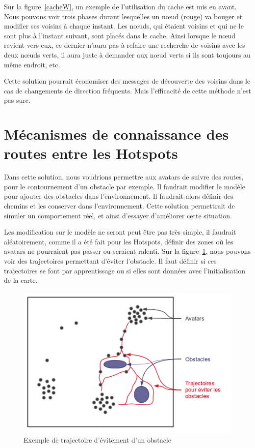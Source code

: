 \documentclass[11pt,a4paper]{article}
\begin{document}
\par Sur la figure~\ref{cacheW}, un exemple de l'utilisation du cache est mis en avant. Nous pouvons voir trois phases durant lesquelles un nœud (rouge) va bouger et modifier ses voisins à chaque instant. Les nœuds, qui étaient voisins et qui ne le sont plus à l'instant suivant, sont placés dans le cache. Ainsi lorsque le nœud revient vers eux, ce dernier n'aura pas à refaire une recherche de voisins avec les deux nœuds verts, il aura juste à demander aux nœud verts si ils sont toujours au même endroit, etc.
\par Cette solution pourrait économiser des messages de découverte des voisins dans le cas de changements de direction fréquents. Mais l'efficacité de cette méthode n'est pas sure. 
 
\section{Mécanismes de connaissance des routes entre les Hotspots}
Dans cette solution, nous voudrions permettre aux avatars de suivre des routes, pour le contournement d'un obstacle par exemple. Il faudrait modifier le modèle pour ajouter des obstacles dans l'environnement. Il faudrait alors définir des chemins et les conserver dans l'environnement. Cette solution permettrait de simuler un comportement réel, et ainsi d'essayer d'améliorer cette situation.
\par Les modification sur le modèle ne seront peut être pas très simple, il faudrait aléatoirement, comme il a été fait pour les Hotspots, définir des zones où les avatars ne pourraient pas passer ou seraient ralenti. Sur la figure~\ref{trajobstacle}, nous pouvons voir des trajectoires permettant d'éviter l'obstacle. Il faut définir si ces trajectoires se font par apprentissage ou si elles sont données avec l'initialisation de la carte.
	\begin{figure}[!h]
        \centering
        \includegraphics[scale=0.55]{./images/trajobstacle}
        \caption{Exemple de trajectoire d'évitement d'un obstacle}
        \label{trajobstacle}
	\end{figure}
\end{document}
